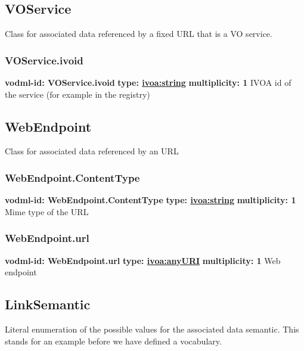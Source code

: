   \subsection{VOService}
  \label{sect:VOService}
    Class for associated data referenced by a fixed URL that is a VO service.

    \subsubsection{VOService.ivoid}
      \textbf{vodml-id: VOService.ivoid} \newline
      \textbf{type: \hyperref[sect:ivoa]{ivoa:string}} \newline
      \textbf{multiplicity: 1} \newline 
      IVOA id of the service (for example in the registry)

  \subsection{WebEndpoint}
  \label{sect:WebEndpoint}
    Class for associated data referenced by an URL

    \subsubsection{WebEndpoint.ContentType}
      \textbf{vodml-id: WebEndpoint.ContentType} \newline
      \textbf{type: \hyperref[sect:ivoa]{ivoa:string}} \newline
      \textbf{multiplicity: 1} \newline 
      Mime type of the URL

    \subsubsection{WebEndpoint.url}
      \textbf{vodml-id: WebEndpoint.url} \newline
      \textbf{type: \hyperref[sect:ivoa]{ivoa:anyURI}} \newline
      \textbf{multiplicity: 1} \newline 
      Web endpoint

  \subsection{LinkSemantic}
  \label{sect:LinkSemantic}

  Literal enumeration of the possible values for the associated data semantic. This stands for an example before we have defined a vocabulary.


